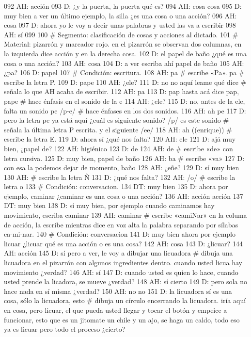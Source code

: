 092 AH: acción
093 D: ¿y la puerta, la puerta qué es?
094 AH: cosa cosa
095 D: muy bien a ver un último ejemplo, la silla ¿es una cosa o una acción?
096 AH: cosa
097 D: ahora yo le voy a decir unas palabras y usted las va a escribir
098 AH: sí
099 
100 # Segmento: clasificación de cosas y acciones al dictado.
101 # Material: pizarrón y marcador rojo. en el pizarrón se observan dos columnas, en la izquierda dice acción y en la derecha cosa.
102 D: el papel de baño ¿qué es una cosa o una acción?
103 AH: cosa
104 D: a ver escriba ahí papel de baño
105 AH: ¿pa?
106 D: papel
107 # Condición: escritura.
108 AH: pa # escribe «Pa». pa # escribe la letra P.
109 D: pape
110 AH: ¿ele?
111 D: no no aquí leame qué dice # señala lo que AH acaba de escribir.
112 AH: pa
113 D: pap hasta acá dice pap, pape # hace énfasis en el sonido de la e
114 AH: ¿ele?
115 D: no, antes de la ele, falta un sonido pe /p-e/ # hace énfases en los dos sonidos.
116 AH: ah pe
117 D: pero la letra pe ya está aquí ¿cuál es siguiente sonido? /p/ es este sonido # señala la última letra P escrita. y el siguiente /ee/
118 AH: ah ((enrique)) # escribe la letra E.
119 D: ahora sí ¿qué nos falta?
120 AH: ele
121 D: ajá muy bien, ¿papel de?
122 AH: higiénico
123 D: de
124 AH: de # escribe «de» con letra cursiva.
125 D: muy bien, papel de baño
126 AH: ba # escribe «va»
127 D: con esa la podemos dejar de momento, baño
128 AH: ¿eñe?
129 D: sí muy bien
130 AH: # escribe la letra Ñ
131 D: ¿qué nos falta?
132 AH: /o/ # escribe la letra o
133 # Condición: conversacion.
134 DT: muy bien
135 D: ahora por ejemplo, caminar ¿caminar es una cosa o una acción?
136 AH: acción acción
137 DT: muy bien
138 D: sí muy bien, por ejemplo cuando caminamos hay movimiento, escriba caminar
139 AH: caminar # escribe «camiNar» en la columa de acción, la escribe mientras dice en voz alta la palabra separando por sílabas ca-mi-nar.
140 # Condición: conversacion
141 D: muy bien ahora por ejemplo licuar ¿licuar qué es una acción o es una cosa?
142 AH: cosa
143 D: ¿licuar?
144 AH: acción
145 D: sí pero a ver, le voy a dibujar una licuadora # dibuja una licuadora en el pizarrón con algunos ingredientes dentro. cuando usted licua hay movimiento ¿verdad?
146 AH: sí
147 D: cuando usted es quien lo hace, cuando usted prende la licadora, se mueve ¿verdad?
148 AH: sí cierto
149 D: pero sola no hace nada en sí misma ¿verdad?
150 AH: no no
151 D: la licuadora sí es una cosa, sólo la licuadora, esto # dibuja un círculo encerrando la licuadora. iría aquí en cosa, pero licuar, el que pueda usted llegar y tocar el botón y empeice a funcionar, esto que es un jitomate un chile y un ajo, se haga un caldo, todo eso ya es licuar pero todo el proceso ¿cierto?
